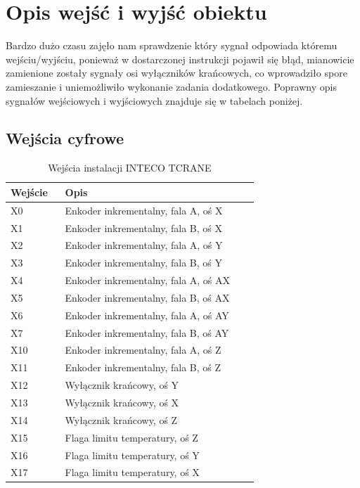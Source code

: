 \section{Opis wejść i wyjść obiektu}
\label{Opis::IO}

Bardzo dużo czasu zajęło nam sprawdzenie który sygnał odpowiada któremu wejściu/wyjściu, 
ponieważ w dostarczonej instrukcji pojawił się błąd, mianowicie zamienione zostały sygnały 
osi wyłączników krańcowych, co wprowadziło spore zamieszanie i uniemożliwiło wykonanie zadania 
dodatkowego. Poprawny opis sygnałów wejściowych i wyjściowych znajduje się w tabelach poniżej.

\subsection{Wejścia cyfrowe}
\label{Opis::IO::Input}

\begin{table}[H]
    \centering
    \begin{tabular}{|p{0.1\linewidth}|p{0.6\linewidth}|}
	\hline
	Wejście & Opis \\ \hline
	X0 & Enkoder inkrementalny, fala A, oś X              \\ \hline
	X1 & Enkoder inkrementalny, fala B, oś X                   \\ \hline
	X2 & Enkoder inkrementalny, fala A, oś Y 		         \\  \hline
	X3 & Enkoder inkrementalny, fala B, oś Y            \\ \hline
	X4 & Enkoder inkrementalny, fala A, oś AX 		         \\  \hline
    X5 & Enkoder inkrementalny, fala B, oś AX           \\ \hline
    X6 & Enkoder inkrementalny, fala A, oś AY 		         \\  \hline
    X7 & Enkoder inkrementalny, fala B, oś AY            \\ \hline
    X10 & Enkoder inkrementalny, fala A, oś Z  		         \\  \hline
    X11 & Enkoder inkrementalny, fala B, oś Z            \\ \hline
    X12 & Wyłącznik krańcowy, oś Y 		         \\  \hline
    X13 & Wyłącznik krańcowy, oś X 		         \\  \hline
    X14 & Wyłącznik krańcowy, oś Z 		         \\  \hline
    X15 & Flaga limitu temperatury, oś Z 		         \\  \hline
    X16 & Flaga limitu temperatury, oś Y 		         \\  \hline
    X17 & Flaga limitu temperatury, oś X 		         \\  \hline
	\end{tabular}
    \caption{Wejścia instalacji INTECO TCRANE}
\end{table}

